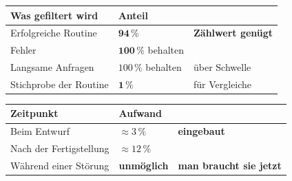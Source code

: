 \begin{aufgabe}
\begin{center}
\begin{minipage}{0.88\textwidth}
\end{minipage}
\end{center}

\begin{center}
\renewcommand{\arraystretch}{1.45}
\begin{tabular}{@{}P{3.0cm}P{2.2cm}P{2.8cm}@{}}
\toprule
\textbf{Was gefiltert wird} & \textbf{Anteil} & \\
\midrule
Erfolgreiche Routine & $\mathbf{94\,\%}$ & \textcolor{gruen}{\textbf{Zählwert genügt}}\\
Fehler & $\mathbf{100\,\%}$ behalten & \\
Langsame Anfragen & $100\,\%$ behalten & \textcolor{gruen}{über Schwelle}\\
Stichprobe der Routine & $\mathbf{1\,\%}$ & \textcolor{gruen}{für Vergleiche}\\
\bottomrule
\end{tabular}
\end{center}

\begin{center}
\end{center}

\begin{warnung}
\begin{center}
\renewcommand{\arraystretch}{1.5}
\begin{tabular}{@{}P{3.0cm}P{2.2cm}P{2.8cm}@{}}
\toprule
\textbf{Zeitpunkt} & \textbf{Aufwand} & \\
\midrule
Beim Entwurf & \textcolor{gruen}{$\approx3\,\%$} & \textcolor{gruen}{\textbf{eingebaut}}\\
Nach der Fertigstellung & $\approx12\,\%$ & \\
Während einer Störung & \textcolor{akzent}{\textbf{unmöglich}} & \textcolor{akzent}{\textbf{man braucht sie jetzt}}\\
\bottomrule
\end{tabular}
\end{center}


\end{warnung}
\end{aufgabe}
